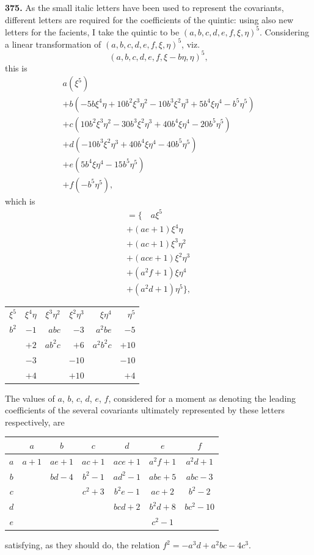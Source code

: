 \documentclass[11pt,a4paper]{book}
\providecommand{\between}{,}
\begin{document}
\noindent\textbf{375.} As the small italic letters have been used to represent the covariants, different letters are required for the coefficients of the quintic: using also new letters for the facients, I take the quintic to be $(a, b, c, d, e, f \between \xi, \eta)^5$. Considering a linear transformation of $(a, b, c, d, e, f \between \xi, \eta)^5$, viz.
\[
(a, b, c, d, e, f \between \xi - b\eta, \eta)^5,
\]
this is
\begin{multline*}
a(\xi^5) \\
+ b(-5b\xi^4\eta + 10b^2\xi^3\eta^2 - 10b^3\xi^2\eta^3 + 5b^4\xi\eta^4 - b^5\eta^5) \\
+ c(10b^2\xi^3\eta^2 - 30b^3\xi^2\eta^3 + 40b^4\xi\eta^4 - 20b^5\eta^5) \\
+ d(-10b^3\xi^2\eta^3 + 40b^4\xi\eta^4 - 40b^5\eta^5) \\
+ e(5b^4\xi\eta^4 - 15b^5\eta^5) \\
+ f(-b^5\eta^5),
\end{multline*}
which is
\begin{multline*}
= \{\quad a\xi^5 \\
+ (ae + 1)\xi^4\eta \\
+ (ac + 1)\xi^3\eta^2 \\
+ (ace + 1)\xi^2\eta^3 \\
+ (a^2 f + 1)\xi\eta^4 \\
+ (a^2 d + 1)\eta^5\},
\end{multline*}
\begin{center}
\begin{tabular}{r@{\quad}r@{\quad}r@{\quad}r@{\quad}r@{\quad}r}
$\xi^5$ & $\xi^4\eta$ & $\xi^3\eta^2$ & $\xi^2\eta^3$ & $\xi\eta^4$ & $\eta^5$ \\[2pt]
$b^2$ & $-1$ & $abc$ & $-3$ & $a^2 be$ & $-5$ \\
& $+2$ & $ab^2 c$ & $+6$ & $a^2 b^2 c$ & $+10$ \\
& $-3$ & & $-10$ & & $-10$ \\
& $+4$ & & $+10$ & & $+4$
\end{tabular}
\end{center}

The values of $a$, $b$, $c$, $d$, $e$, $f$, considered for a moment as denoting the leading coefficients of the several covariants ultimately represented by these letters respectively, are
\begin{center}
\begin{tabular}{c|cccccc}
& $a$ & $b$ & $c$ & $d$ & $e$ & $f$ \\[2pt]
\hline
$a$ & $a+1$ & $ae+1$ & $ac+1$ & $ace+1$ & $a^2 f+1$ & $a^2 d+1$ \\
$b$ & & $bd-4$ & $b^2-1$ & $ad^2-1$ & $abe+5$ & $abc-3$ \\
$c$ & & & $c^2+3$ & $b^2 e-1$ & $ac+2$ & $b^2-2$ \\
$d$ & & & & $bcd+2$ & $b^2 d+8$ & $bc^2-10$ \\
$e$ & & & & & $c^2-1$ &
\end{tabular}
\end{center}
satisfying, as they should do, the relation $f^2 = -a^3 d + a^2 bc - 4c^3$.
\end{document}
